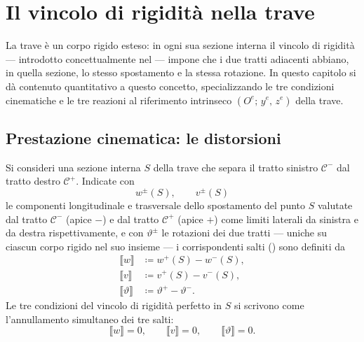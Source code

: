 \section{Il vincolo di rigidità nella trave}
\label{sec:continuita_trave}

La trave è un corpo rigido esteso: in ogni sua sezione
interna il vincolo di rigidità --- introdotto
concettualmente nel  ---
impone che i due tratti adiacenti abbiano, in quella
sezione, lo stesso spostamento e la stessa rotazione.
In questo capitolo si dà contenuto quantitativo a
questo concetto, specializzando le tre condizioni
cinematiche e le tre reazioni al riferimento intrinseco
$(O^e;\, y^e,\, z^e)$ della trave.

\subsection{Prestazione cinematica: le distorsioni}
\label{sec:distorsioni}
Si consideri una sezione interna $S$ della trave che separa 
il tratto sinistro $\mathcal{C}^-$ dal tratto destro 
$\mathcal{C}^+$. Indicate con
\begin{equation*}
	w^\pm(S),\qquad v^\pm(S)
\end{equation*}
le componenti longitudinale e trasversale dello spostamento 
del punto $S$ valutate dal tratto $\mathcal{C}^-$ (apice $-$) 
e dal tratto $\mathcal{C}^+$ (apice $+$) come limiti laterali 
da sinistra e da destra rispettivamente, e con $\vartheta^\pm$ 
le rotazioni dei due tratti --- uniche su ciascun corpo rigido 
nel suo insieme --- i corrispondenti salti 
() sono definiti da
\begin{align}
	\llbracket w \rrbracket &\coloneqq w^+(S) - w^-(S),
	\label{eq:salto_w} \\
	\llbracket v \rrbracket &\coloneqq v^+(S) - v^-(S),
	\label{eq:salto_v} \\
	\llbracket \vartheta \rrbracket &\coloneqq 
	\vartheta^+ - \vartheta^-.
	\label{eq:salto_theta}
\end{align}
Le tre condizioni del vincolo di rigidità perfetto in $S$ 
si scrivono come l'annullamento simultaneo dei tre salti:
\begin{equation}\label{eq:rigidita_perfetta}
	\llbracket w \rrbracket = 0, \qquad
	\llbracket v \rrbracket = 0, \qquad
	\llbracket \vartheta \rrbracket = 0.
\end{equation}


